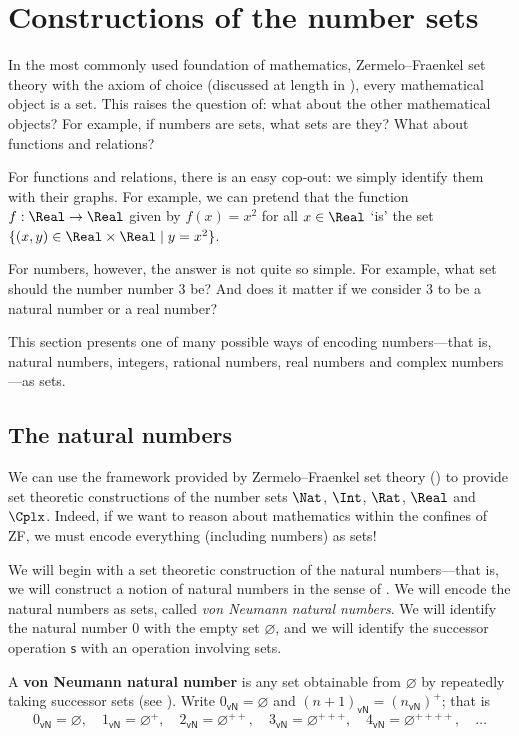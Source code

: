 \section{Constructions of the number sets}

In the most commonly used foundation of mathematics, Zermelo--Fraenkel set theory with the axiom of choice (discussed at length in ), every mathematical object is a set. This raises the question of: what about the other mathematical objects? For example, if numbers are sets, what sets are they? What about functions and relations?

For functions and relations, there is an easy cop-out: we simply identify them with their graphs. For example, we can pretend that the function $f : \Real \to \Real$ given by $f(x) = x^2$ for all $x \in \Real$ `is' the set $\{ (x,y) \in \Real \times \Real \mid y = x^2 \}$.

For numbers, however, the answer is not quite so simple. For example, what set should the number number $3$ be? And does it matter if we consider $3$ to be a natural number or a real number?

This section presents one of many possible ways of encoding numbers---that is, natural numbers, integers, rational numbers, real numbers and complex numbers---as sets.

\subsection*{The natural numbers}

We can use the framework provided by Zermelo--Fraenkel set theory () to provide set theoretic constructions of the number sets $\Nat$, $\Int$, $\Rat$, $\Real$ and $\Cplx$. Indeed, if we want to reason about mathematics within the confines of ZF, we must encode everything (including numbers) as sets!

We will begin with a set theoretic construction of the natural numbers---that is, we will construct a notion of natural numbers in the sense of . We will encode the natural numbers as sets, called \textit{von Neumann natural numbers}. We will identify the natural number $0$ with the empty set $\varnothing$, and we will identify the successor operation $\mathsf{s}$ with an operation involving sets.

\begin{definition}
\label{defVonNeumannNaturalNumbers}
A \textbf{von Neumann natural number} is any set obtainable from $\varnothing$ by repeatedly taking successor sets (see ). Write $0_{\mathsf{vN}} = \varnothing$ and $(n+1)_{\mathsf{vN}} = (n_{\mathsf{vN}})^+$; that is
\[ 0_{\mathsf{vN}} = \varnothing, \quad 1_{\mathsf{vN}} = \varnothing^+, \quad 2_{\mathsf{vN}} = \varnothing^{++}, \quad 3_{\mathsf{vN}} = \varnothing^{+++}, \quad 4_{\mathsf{vN}} = \varnothing^{++++}, \quad \dots \]
\end{definition}

